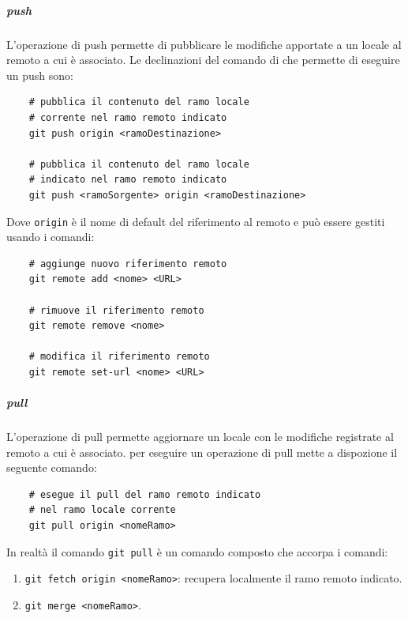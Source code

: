 \subparagraph{push}
\label{subpar:push}
L'operazione di push permette di pubblicare le modifiche apportate a un  locale al  remoto a cui è associato.
Le declinazioni del comando di  che permette di eseguire un push sono:
\begin{lstlisting}
    # pubblica il contenuto del ramo locale 
    # corrente nel ramo remoto indicato
    git push origin <ramoDestinazione> 

    # pubblica il contenuto del ramo locale
    # indicato nel ramo remoto indicato
    git push <ramoSorgente> origin <ramoDestinazione>
\end{lstlisting}   
Dove \texttt{origin} è il nome di default del riferimento al  remoto e può essere gestiti usando i comandi:
\begin{lstlisting}
    # aggiunge nuovo riferimento remoto
    git remote add <nome> <URL>

    # rimuove il riferimento remoto
    git remote remove <nome>

    # modifica il riferimento remoto
    git remote set-url <nome> <URL>
\end{lstlisting}

\subparagraph{pull}
\label{subpar:pull}
L'operazione di pull permette aggiornare un  locale con le modifiche registrate al  remoto a cui è associato.
 per eseguire un operazione di pull mette a dispozione il seguente comando:
\begin{lstlisting}
    # esegue il pull del ramo remoto indicato
    # nel ramo locale corrente
    git pull origin <nomeRamo>
\end{lstlisting}
In realtà il comando \lstinline|git pull| è un comando composto che accorpa i comandi:
\begin{enumerate}
    \item \lstinline|git fetch origin <nomeRamo>|: recupera localmente il ramo remoto indicato.
    \item \lstinline|git merge <nomeRamo>|.
\end{enumerate}

